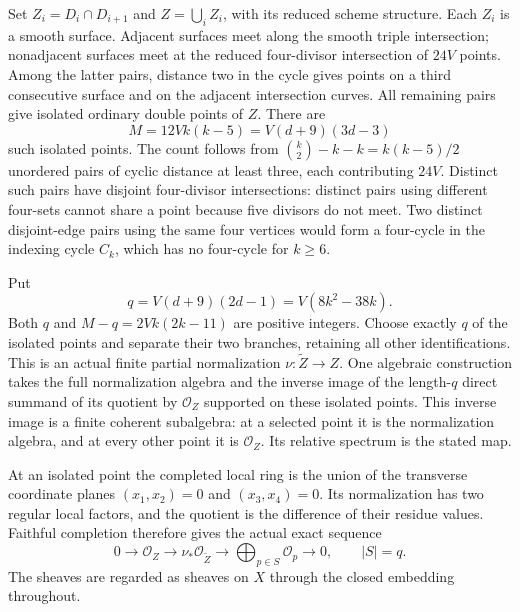 Set $Z_i=D_i\cap D_{i+1}$ and $Z=\bigcup_i Z_i$, with
its reduced scheme structure. Each $Z_i$ is a smooth surface.
Adjacent surfaces meet along the smooth triple intersection;
nonadjacent surfaces meet at the reduced four-divisor intersection
of $24V$ points. Among the latter pairs, distance two in the
cycle gives points on a third consecutive surface and on the
adjacent intersection curves. All remaining pairs give isolated
ordinary double points of $Z$. There are
\[
             M=12Vk(k-5)=V(d+9)(3d-3)                       \tag{R11.2}
\]
such isolated points. The count follows from
$\binom k2-k-k=k(k-5)/2$ unordered pairs of cyclic distance
at least three, each contributing $24V$. Distinct such pairs
have disjoint four-divisor intersections: distinct pairs using
different four-sets cannot share a point because five divisors
do not meet. Two distinct disjoint-edge pairs using the same
four vertices would form a four-cycle in the indexing cycle
$C_k$, which has no four-cycle for $k\ge6$.

Put
\[
                 q=V(d+9)(2d-1)=V(8k^2-38k).              \tag{R11.3}
\]
Both $q$ and $M-q=2Vk(2k-11)$ are positive integers.
Choose exactly $q$ of the isolated points and separate their
two branches, retaining all other identifications. This is an
actual finite partial normalization $\nu:\widetilde Z\to Z$.
One algebraic construction takes the full normalization algebra
and the inverse image of the length-$q$ direct summand of its
quotient by $\mathcal O_Z$ supported on these isolated points.
This inverse image is a finite coherent subalgebra: at a selected
point it is the normalization algebra, and at every other point
it is $\mathcal O_Z$. Its relative spectrum is the stated map.

At an isolated point the completed local ring is the union of
the transverse coordinate planes $(x_1,x_2)=0$ and
$(x_3,x_4)=0$. Its normalization has two regular local factors,
and the quotient is the difference of their residue values.
Faithful completion therefore gives the actual exact sequence
\[
 0\longrightarrow\mathcal O_Z\longrightarrow\nu_*\mathcal O_{\widetilde Z}
                  \longrightarrow\bigoplus_{p\in S}\mathcal O_p
                  \longrightarrow0,\qquad |S|=q.            \tag{R11.4}
\]
The sheaves are regarded as sheaves on $X$ through the closed
embedding throughout.

